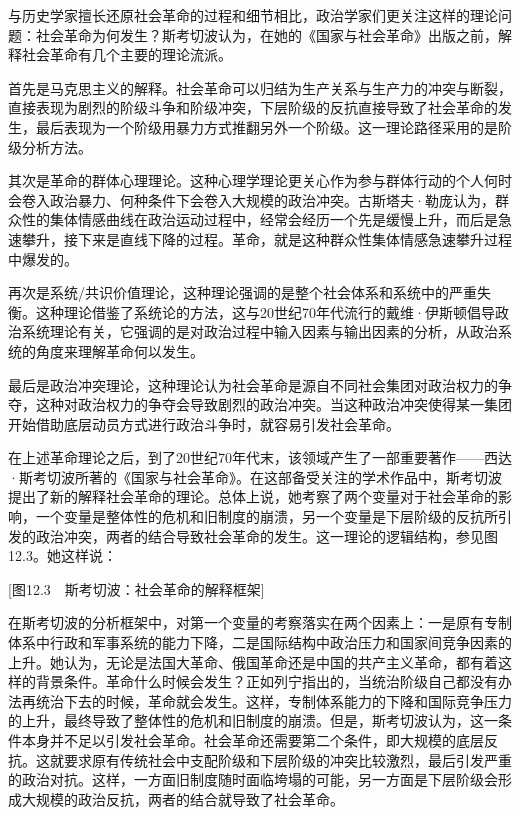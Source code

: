 与历史学家擅长还原社会革命的过程和细节相比，政治学家们更关注这样的理论问题：社会革命为何发生？斯考切波认为，在她的《国家与社会革命》出版之前，解释社会革命有几个主要的理论流派。

首先是马克思主义的解释。社会革命可以归结为生产关系与生产力的冲突与断裂，直接表现为剧烈的阶级斗争和阶级冲突，下层阶级的反抗直接导致了社会革命的发生，最后表现为一个阶级用暴力方式推翻另外一个阶级。这一理论路径采用的是阶级分析方法。

其次是革命的群体心理理论。这种心理学理论更关心作为参与群体行动的个人何时会卷入政治暴力、何种条件下会卷入大规模的政治冲突。古斯塔夫·勒庞认为，群众性的集体情感曲线在政治运动过程中，经常会经历一个先是缓慢上升，而后是急速攀升，接下来是直线下降的过程。革命，就是这种群众性集体情感急速攀升过程中爆发的。

再次是系统/共识价值理论，这种理论强调的是整个社会体系和系统中的严重失衡。这种理论借鉴了系统论的方法，这与20世纪70年代流行的戴维·伊斯顿倡导政治系统理论有关，它强调的是对政治过程中输入因素与输出因素的分析，从政治系统的角度来理解革命何以发生。

最后是政治冲突理论，这种理论认为社会革命是源自不同社会集团对政治权力的争夺，这种对政治权力的争夺会导致剧烈的政治冲突。当这种政治冲突使得某一集团开始借助底层动员方式进行政治斗争时，就容易引发社会革命。

在上述革命理论之后，到了20世纪70年代末，该领域产生了一部重要著作——西达·斯考切波所著的《国家与社会革命》。在这部备受关注的学术作品中，斯考切波提出了新的解释社会革命的理论。总体上说，她考察了两个变量对于社会革命的影响，一个变量是整体性的危机和旧制度的崩溃，另一个变量是下层阶级的反抗所引发的政治冲突，两者的结合导致社会革命的发生。这一理论的逻辑结构，参见图12.3。她这样说：


[图12.3　斯考切波：社会革命的解释框架]

在斯考切波的分析框架中，对第一个变量的考察落实在两个因素上：一是原有专制体系中行政和军事系统的能力下降，二是国际结构中政治压力和国家间竞争因素的上升。她认为，无论是法国大革命、俄国革命还是中国的共产主义革命，都有着这样的背景条件。革命什么时候会发生？正如列宁指出的，当统治阶级自己都没有办法再统治下去的时候，革命就会发生。这样，专制体系能力的下降和国际竞争压力的上升，最终导致了整体性的危机和旧制度的崩溃。但是，斯考切波认为，这一条件本身并不足以引发社会革命。社会革命还需要第二个条件，即大规模的底层反抗。这就要求原有传统社会中支配阶级和下层阶级的冲突比较激烈，最后引发严重的政治对抗。这样，一方面旧制度随时面临垮塌的可能，另一方面是下层阶级会形成大规模的政治反抗，两者的结合就导致了社会革命。

